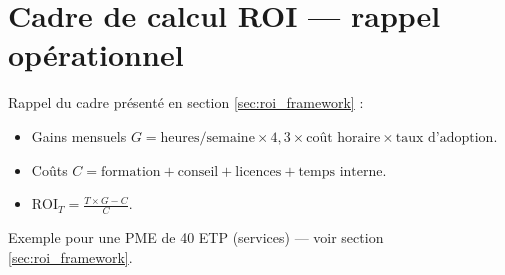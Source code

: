 \section{Cadre de calcul ROI — rappel opérationnel}
Rappel du cadre présenté en section \ref{sec:roi_framework} :
\begin{itemize}
    \item Gains mensuels $G = \text{heures/semaine} \times 4{,}3 \times \text{coût horaire} \times \text{taux d'adoption}$.
    \item Coûts $C = \text{formation} + \text{conseil} + \text{licences} + \text{temps interne}$.
    \item $\text{ROI}_T = \frac{T \times G - C}{C}$.
\end{itemize}
Exemple pour une PME de 40 ETP (services) — voir section \ref{sec:roi_framework}.
